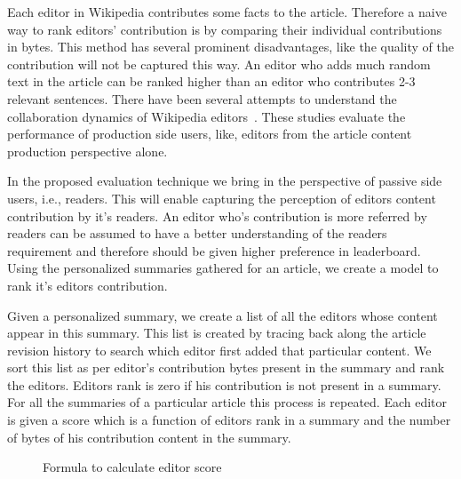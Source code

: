 \documentclass[12pt]{article}
\begin{document}
Each editor in Wikipedia contributes some facts to the article. Therefore a naive way to rank editors' contribution is by comparing their individual contributions in bytes. This method has several prominent disadvantages, like the quality of the contribution will not be captured this way. An editor who adds much random text in the article can be ranked higher than an editor who contributes 2-3 relevant sentences. There have been several attempts to understand the collaboration dynamics of Wikipedia editors~\cite{kim2016understanding, sepehri2012leveraging, wagner2016women}. These studies evaluate the performance of production side users, like, editors from the article content production perspective alone. 

In the proposed evaluation technique we bring in the perspective of passive side users, i.e., readers. This will enable capturing the perception of editors content contribution by it's readers. An editor who's contribution is more referred by readers can be assumed to have a better understanding of the readers requirement and therefore should be given higher preference in leaderboard. Using the personalized summaries gathered for an article, we create a model to rank it's editors contribution. 

Given a personalized summary, we create a list of all the editors whose content appear in this summary. This list is created by tracing back along the article revision history to search which editor first added that particular content. We sort this list as per editor's contribution bytes present in the summary and rank the editors. Editors rank is zero if his contribution is not present in a summary. For all the summaries of a particular article this process is repeated. Each editor is given a score which is a function of editors rank in a summary and the number of bytes of his contribution content in the summary.   



\begin{figure}[!htb]
        \caption{\label{fig:editor_contrib} Formula to calculate editor score}
\end{figure}
\end{document}
